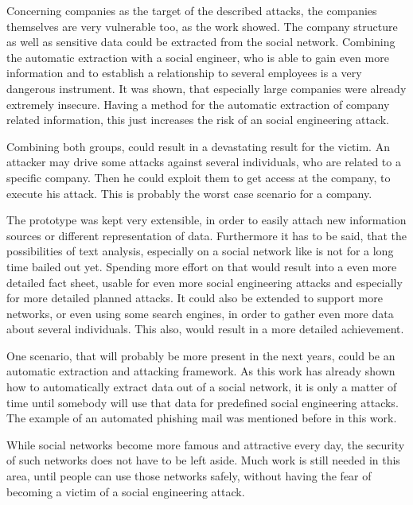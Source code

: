 Concerning companies as the target of the described attacks, the companies
themselves are very vulnerable too, as the work showed. The company
structure as well as sensitive data could be extracted from the social network.
Combining the automatic extraction with a social engineer, who is able to gain
even more information and to establish a relationship to several employees is a
very dangerous instrument. It was shown, that especially large companies were
already extremely insecure. Having a method for the automatic extraction of
company related information, this just increases the risk of an social
engineering attack.

Combining both groups, could result in a devastating result for the victim. An
attacker may drive some attacks against several individuals, who are related to a
specific company. Then he could exploit them to get access at the company, to
execute his attack. This is probably the worst case scenario for a company.

The prototype was kept very extensible, in order to easily attach new
information sources or different representation of data. Furthermore it has to
be said, that the possibilities of text analysis, especially on a social
network like \Twitter{} is not for a long time bailed out yet. Spending more
effort on that would result into a even more detailed fact sheet, usable for
even more social engineering attacks and especially for more detailed planned
attacks. It could also be extended to support more networks, or even using
some search engines, in order to gather even more data about several
individuals. This also, would result in a more detailed achievement.

One scenario, that will probably be more present in the next years, could be an
automatic extraction and attacking framework. As this work has already shown
how to automatically extract data out of a social network, it is only a matter
of time until somebody will use that data for predefined social engineering
attacks. The example of an automated phishing mail was mentioned before in this
work.

While social networks become more famous and attractive every day, the security
of such networks does not have to be left aside. Much work is still needed in
this area, until people can use those networks safely, without having the fear
of becoming a victim of a social engineering attack.
